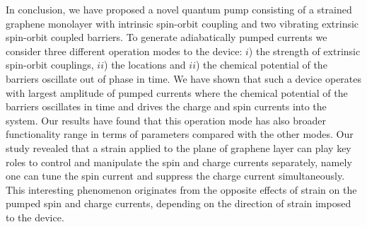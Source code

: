 \documentclass[doublecol]{epl2}
\begin{document}
In conclusion, we have proposed a novel quantum pump consisting of a
strained graphene monolayer with intrinsic spin-orbit coupling and
two vibrating extrinsic spin-orbit coupled barriers. To generate
adiabatically pumped currents we consider three different operation
modes to the device: $i$) the strength of extrinsic spin-orbit
couplings, $ii$) the locations and $ii$) the chemical potential of
the barriers oscillate out of phase in time. We have shown that such
a device operates with largest amplitude of pumped currents where
the chemical potential of the barriers oscillates in time and drives
the charge and spin currents into the system. Our results have found
that this operation mode has also broader functionality range in
terms of parameters compared with the other modes. Our study
revealed that a strain applied to the plane of graphene layer can
play key roles to control and manipulate the spin and charge
currents separately, namely one can tune the spin current and
suppress the charge current simultaneously. This interesting
phenomenon originates from the opposite effects of strain on the
pumped spin and charge currents, depending on the direction of
strain imposed to the device.
\end{document}

